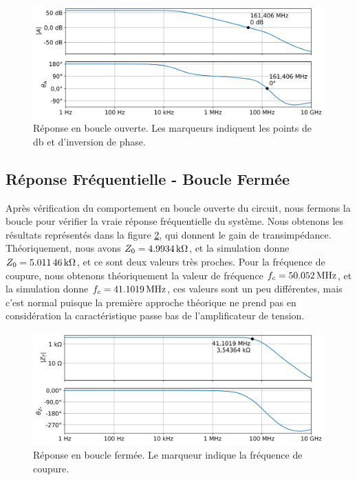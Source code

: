 \documentclass[a4paper,12pt]{article}
\numberwithin{equation}{section}
\newcommand{\?}{\stackrel{?}{=}}
\newcommand{\sis}[2]{\complexnum{#1}\,\si[per-mode=symbol]{#2}}
\begin{document}
\begin{figure}[htp!]
    \centering
    \includegraphics[width=\linewidth]{images/open_loop.png}
    \caption{Réponse en boucle ouverte. Les marqueurs indiquent les points de \sis{0}{\decibel} et d'inversion de phase.}
    \label{fig:open_loop}
\end{figure}


\subsection{Réponse Fréquentielle - Boucle Fermée}

Après vérification du comportement en boucle ouverte du circuit, nous fermons la boucle pour vérifier la vraie réponse fréquentielle du système. Nous obtenons les résultats représentés dans la figure \ref{fig:gain_transimp}, qui donnent le gain de transimpédance. Théoriquement, nous avons $Z_0 = \sis{4.9934}{\kilo\ohm}$, et la simulation donne $Z_0 = \sis{5.01146}{\kilo\ohm}$, et ce sont deux valeurs très proches. Pour la fréquence de coupure, nous obtenons théoriquement la valeur de fréquence $f_c = \sis{50.052}{\mega\hertz}$, et la simulation donne $f_c = \sis{41.1019}{\mega\hertz}$, ces valeurs sont un peu différentes, mais c'est normal puisque la première approche théorique ne prend pas en considération la caractéristique passe bas de l'amplificateur de tension.  

\begin{figure}[htp!]
    \centering
    \includegraphics[width=\linewidth]{images/gain_transimp.png}
    \caption{Réponse en boucle fermée. Le marqueur indique la fréquence de coupure.}
    \label{fig:gain_transimp}
\end{figure}
\end{document}
